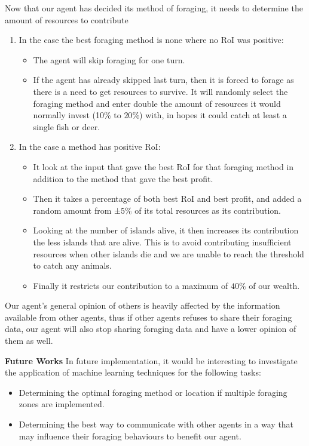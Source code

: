 Now that our agent has decided its method of foraging, it needs to determine the amount of resources to contribute
\begin{enumerate}
    \item In the case the best foraging method is none where no RoI was positive:
        \begin{itemize}
            \item The agent will skip foraging for one turn.
            \item If the agent has already skipped last turn, then it is forced to forage as there is a need to get resources to survive. It will randomly select the foraging method and enter double the amount of resources it would normally invest (10\% to $20\%$) with, in hopes it could catch at least a single fish or deer.
        \end{itemize}

    \item In the case a method has positive RoI:
        \begin{itemize}
            \item It look at the input that gave the best RoI for that foraging method in addition to the method that gave the best profit.
            \item Then it takes a percentage of both best RoI and best profit, and added a random amount from ±$5\%$ of its total resources as its contribution.
            \item Looking at the number of islands alive, it then increases its contribution the less islands that are alive. This is to avoid contributing insufficient resources when other islands die and we are unable to reach the threshold to catch any animals. 
            \item Finally it restricts our contribution to a maximum of $40\%$ of our wealth.
        \end{itemize}
\end{enumerate}

Our agent's general opinion of others is heavily affected by the information available from other agents, thus if other agents refuses to share their foraging data, our agent will also stop sharing foraging data and have a lower opinion of them as well. \newline


\textbf{Future Works}\newline 
In future implementation, it would be interesting to investigate the application of machine learning techniques for the following tasks:
\begin{itemize}
    \item Determining the optimal foraging method or location if multiple foraging zones are implemented.
    \item Determining the best way to communicate with other agents in a way that may influence their foraging behaviours to benefit our agent.
\end{itemize}

